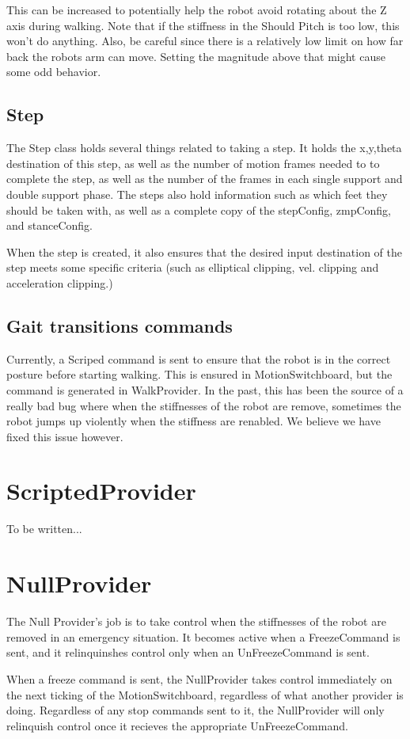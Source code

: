 \documentclass[11pt]{article}
\begin{document}
This can be increased to potentially help the robot avoid rotating about
the Z axis during walking. Note that if the stiffness in the Should Pitch is
too low, this won't do anything. Also, be careful since there is a relatively
low limit on how far back the robots arm can move. Setting the magnitude above
that might cause some odd behavior.

\subsection{Step}
The Step class holds several things related to taking a step. It holds
the x,y,theta destination of this step, as well as the number of motion
frames needed to to complete the step, as well as the number of the frames
in each single support and double support phase. The steps also
hold information such as which feet they should be taken with, as well
as a complete copy of the stepConfig, zmpConfig, and stanceConfig.

When the step is created, it also ensures that the desired input destination
of the step meets some specific criteria (such as elliptical clipping, vel.
clipping and acceleration clipping.)

\subsection{Gait transitions commands}
Currently, a Scriped command is sent to ensure that the robot is in the correct
posture before starting walking.  This is ensured in MotionSwitchboard,
but the command is generated in WalkProvider.  In the past, this has been
the source of a really bad bug where when the stiffnesses of the robot
are remove, sometimes the robot jumps up violently when the stiffness
are renabled. We believe we have fixed this issue however.

\section{ScriptedProvider}
To be written...
\section{NullProvider}
The Null Provider's job is to take control when the stiffnesses of the robot
are removed in an emergency situation.  It becomes active when a FreezeCommand
is sent, and it relinquinshes control only when an UnFreezeCommand is sent.

When a freeze command is sent, the NullProvider takes control immediately on
the next ticking of the MotionSwitchboard, regardless of what another provider
is doing.  Regardless of any stop commands sent to it, the NullProvider will
only relinquish control once it recieves the appropriate UnFreezeCommand.
\end{document}
